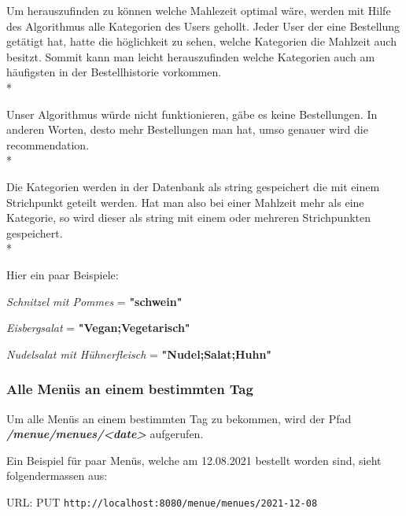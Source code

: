 Um herauszufinden zu können welche Mahlezeit optimal wäre, werden mit Hilfe des Algorithmus alle Kategorien des Users gehollt. 
Jeder User der eine Bestellung getätigt hat, hatte die höglichkeit zu sehen, welche Kategorien die Mahlzeit auch besitzt. Sommit kann man leicht herauszufinden
welche Kategorien auch am häufigsten in der Bestellhistorie vorkommen. \\*

Unser Algorithmus würde nicht funktionieren, gäbe es keine Bestellungen. In anderen Worten, desto mehr Bestellungen man hat, umso genauer wird die recommendation. \\*

Die Kategorien werden in der Datenbank als string gespeichert die mit einem Strichpunkt geteilt werden. Hat man also bei einer Mahlzeit mehr als eine Kategorie,
so wird dieser als string mit einem oder mehreren Strichpunkten gespeichert. \\*

Hier ein paar Beispiele:

\textit{Schnitzel mit Pommes} = \textbf{"schwein"}

\textit{Eisbergsalat} = \textbf{"Vegan;Vegetarisch"}

\textit{Nudelsalat mit Hühnerfleisch} = \textbf{"Nudel;Salat;Huhn"}

\subsubsection{Alle Menüs an einem bestimmten Tag}

Um alle Menüs an einem bestimmten Tag zu bekommen, wird der Pfad \textbf{\textit{/menue/menues/<date>}} aufgerufen.

Ein Beispiel für paar Menüs, welche am 12.08.2021 bestellt worden sind, sieht folgendermassen aus:

URL: PUT \colorbox{white}{\lstinline[basicstyle=\ttfamily\color{black},language=html]|http://localhost:8080/menue/menues/2021-12-08|}


